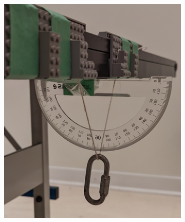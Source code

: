 \documentclass[12pt]{article}
\begin{document}
{\begin{figure}[!hptb]
    \centering
    \begin{subfigure}{0.49\textwidth}
        \centering
        \includegraphics[width=\textwidth]{../figures/exp_setup3_angle.png}
    \end{subfigure}
    \hfill
    \begin{subfigure}{0.49\textwidth}
        \centering

\end{subfigure}
\end{figure}}
\end{document}
